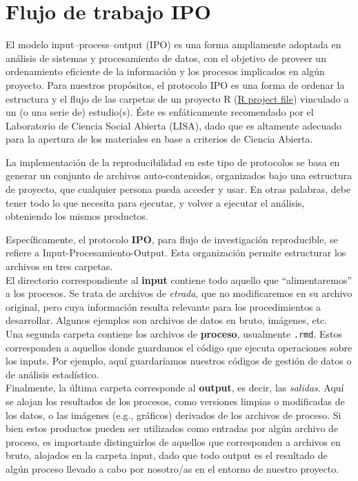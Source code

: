 \documentclass[
]{book}
\begin{document}
\hypertarget{flujo-de-trabajo-ipo}{%
\section{Flujo de trabajo IPO}\label{flujo-de-trabajo-ipo}}

El modelo input--process--output (IPO) es una forma ampliamente adoptada en análisis de sistemas y procesamiento de datos, con el objetivo de proveer un ordenamiento eficiente de la información y los procesos implicados en algún proyecto. Para nuestros propósitos, el protocolo IPO es una forma de ordenar la estructura y el flujo de las carpetas de un proyecto R (\href{https://support.posit.co/hc/en-us/articles/200526207-Using-RStudio-Projects}{R project file}) vinculado a un (o una serie de) estudio(s). Éste es enfáticamente recomendado por el Laboratorio de Ciencia Social Abierta (LISA), dado que es altamente adecuado para la apertura de los materiales en base a criterios de Ciencia Abierta.

La implementación de la reproducibilidad en este tipo de protocolos se basa en generar un conjunto de archivos auto-contenidos, organizados bajo una estructura de proyecto, que cualquier persona pueda acceder y usar. En otras palabras, debe tener todo lo que necesita para ejecutar, y volver a ejecutar el análisis, obteniendo los mismos productos.

Específicamente, el protocolo \textbf{IPO}, para flujo de investigación reproducible, se refiere a Input-Procesamiento-Output. Esta organización permite estructurar los archivos en tres carpetas.\\
El directorio correspondiente al \textbf{input} contiene todo aquello que ``alimentaremos'' a los procesos. Se trata de archivos de \emph{etrada}, que no modificaremos en su archivo original, pero cuya información resulta relevante para los procedimientos a desarrollar. Algunos ejemplos son archivos de datos en bruto, imágenes, etc.\\
Una segunda carpeta contiene los archivos de \textbf{proceso}, usualmente \texttt{.rmd}. Estos corresponden a aquellos donde guardamos el código que ejecuta operaciones sobre los inputs. Por ejemplo, aquí guardaríamos nuestros códigos de gestión de datos o de análisis estadístico.\\
Finalmente, la última carpeta corresponde al \textbf{output}, es decir, las \emph{salidas}. Aquí se alojan los resultados de los procesos, como versiones limpias o modificadas de los datos, o las imágenes (e.g., gráficos) derivados de los archivos de proceso. Si bien estos productos pueden ser utilizados como entradas por algún archivo de proceso, es importante distinguirlos de aquellos que corresponden a archivos en bruto, alojados en la carpeta input, dado que todo output es el resultado de algún proceso llevado a cabo por nosotro/as en el entorno de nuestro proyecto.
\end{document}
